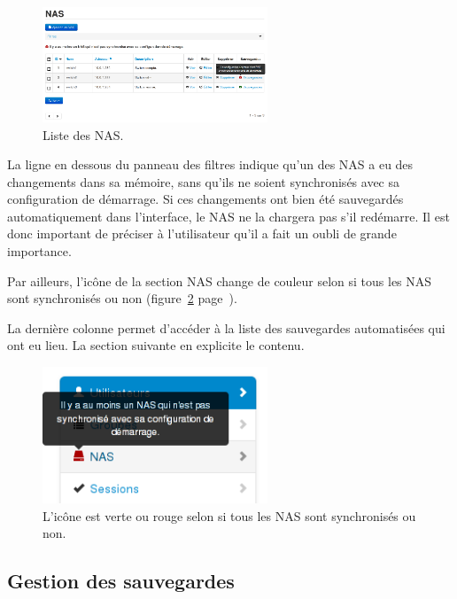 \begin{figure}[!h]
	\begin{center}
	    \includegraphics[width=0.6\textwidth]{img/nas.png}
	\end{center}
	\caption{Liste des NAS.}
	\label{nas}
\end{figure}

La ligne en dessous du panneau des filtres indique qu'un des NAS a eu des changements dans sa mémoire, sans qu'ils ne soient synchronisés avec sa configuration de démarrage. Si ces changements ont bien été sauvegardés automatiquement dans l'interface, le NAS ne la chargera pas s'il redémarre. Il est donc important de préciser à l'utilisateur qu'il a fait un oubli de grande importance.

Par ailleurs, l'icône de la section NAS change de couleur selon si tous les NAS sont synchronisés ou non (figure~\ref{menunas} page~\pageref{menunas}).

La dernière colonne permet d'accéder à la liste des sauvegardes automatisées qui ont eu lieu. La section suivante en explicite le contenu.

\begin{figure}[!h]
	\begin{center}
	    \includegraphics[width=0.6\textwidth]{img/menunas.png}
	\end{center}
	\caption{L'icône est verte ou rouge selon si tous les NAS sont synchronisés ou non.}
	\label{menunas}
\end{figure}

\subsection{Gestion des sauvegardes}

